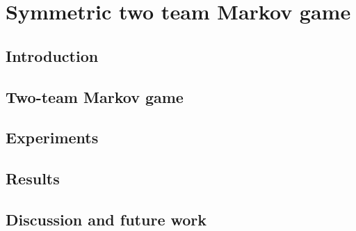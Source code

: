 \chapter{Symmetric two team Markov game}\label{ch:2teams}
\section{Introduction}
\section{Two-team Markov game}
\section{Experiments}
\section{Results}
\section{Discussion and future work}
